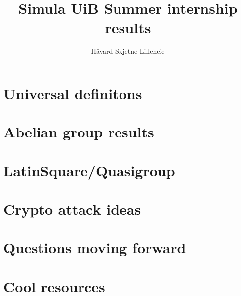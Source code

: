 \documentclass[a4paper, 12pt, english]{article}
\title{Simula UiB Summer internship results}
\author{Håvard Skjetne Lilleheie}
\theoremstyle{plain}
\theoremstyle{definition}
\begin{document}
\maketitle

\section{Universal definitons}



\section{Abelian group results}



\section{LatinSquare/Quasigroup}



\section{Crypto attack ideas}



\section{Questions moving forward}



\section{Cool resources}


\end{document}
